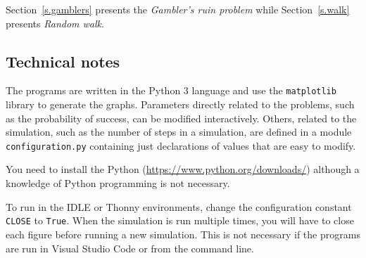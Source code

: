 Section~\ref{s.gamblers} presents the \emph{Gambler's ruin problem} while Section~\ref{s.walk} presents \emph{Random walk}.

\subsection*{Technical notes}

The programs are written in the Python 3 language and use the \verb+matplotlib+ library to generate the graphs. Parameters directly related to the problems, such as the probability of success, can be modified interactively. Others, related to the simulation, such as the number of steps in a simulation, are defined in a module \verb+configuration.py+ containing just declarations of values that are easy to modify.

You need to install the Python (\url{https://www.python.org/downloads/}) although a knowledge of Python programming is not necessary.

To run in the IDLE or Thonny environments, change the configuration constant \verb+CLOSE+ to \verb+True+. When the simulation is run multiple times, you will have to close each figure before running a new simulation. This is not necessary if the programs are run in Visual Studio Code or from the command line.
